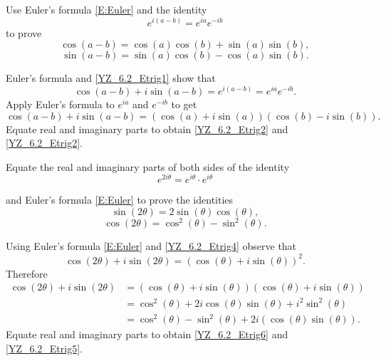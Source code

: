 \documentclass{ximera}
\begin{document}
\begin{exercise}\label{YZ_6.2_trig1}
 Use Euler's formula \eqref{E:Euler} and the identity 
\begin{equation}
    e^{i(a-b)}=e^{ia}e^{-ib}\label{YZ_6.2_Etrig1}
\end{equation}
to prove  
\begin{equation}
 \cos(a-b)=\cos(a)\cos(b)+\sin(a)\sin(b), \label{YZ_6.2_Etrig2}
\end{equation}
\begin{equation}
  \sin(a-b)=\sin(a)\cos(b)-\cos(a)\sin(b). \label{YZ_6.2_Etrig3}  
\end{equation}

\begin{solution}
\soln

Euler's formula and \eqref{YZ_6.2_Etrig1} show that 
\[
 \cos(a-b)+i\sin(a-b)=e^{i(a-b)}=e^{ia}e^{-ib}.
\]
Apply Euler's formula to $e^{ia}$ and $e^{-ib}$ to  get
\[
 \cos(a-b)+i\sin(a-b) = (\cos(a)+i\sin(a))  (\cos(b)-i\sin(b)).  
\]
Equate real and imaginary parts to obtain \eqref{YZ_6.2_Etrig2} and \eqref{YZ_6.2_Etrig2}.
\end{solution}
\end{exercise}

\begin{exercise}\label{YZ_6.2_trig2}
Equate the real and imaginary parts of both sides of the identity \begin{equation}
    e^{2i\theta}=e^{i\theta}\cdot e^{i\theta}\label{YZ_6.2_Etrig4}
\end{equation}

and Euler's formula \eqref{E:Euler} to prove the identities
\begin{equation}
    \sin(2\theta)=2\sin(\theta)\cos(\theta),\label{YZ_6.2_Etrig5}
\end{equation}
\begin{equation}
    \cos(2\theta)=\cos^{2}(\theta)-\sin^{2}(\theta).\label{YZ_6.2_Etrig6}
\end{equation}

\begin{solution}
\soln
Using Euler's formula \eqref{E:Euler} and \eqref{YZ_6.2_Etrig4} observe that
\[
 \cos(2\theta)+i\sin(2\theta) = (\cos(\theta)+i\sin(\theta))^2.
\]
Therefore 
\begin{align*}
    \cos(2\theta)+i\sin(2\theta)&=(\cos(\theta)+i\sin(\theta))(\cos(\theta)+i\sin(\theta))\\
    &=\cos^2(\theta)+2i\cos(\theta)\sin(\theta)+i^2\sin^2(\theta)\\
    &=\cos^2(\theta)-\sin^2(\theta)+2i(\cos(\theta)\sin(\theta)).
\end{align*}
Equate real and imaginary parts to obtain \eqref{YZ_6.2_Etrig6} and \eqref{YZ_6.2_Etrig5}.

\end{solution}

\end{exercise}
\end{document}
